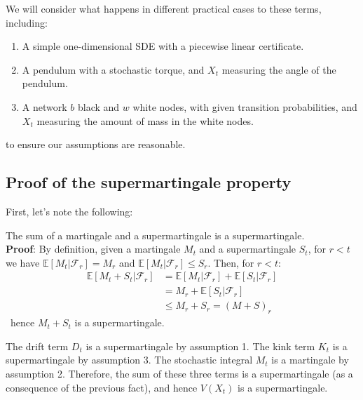 We will consider what happens in different practical cases to these terms, including: 
\begin{enumerate}
  \item A simple one-dimensional SDE with a piecewise linear certificate.
  \item A pendulum with a stochastic torque, and $X_t$ measuring the angle of the pendulum.
  \item A network $b$ black and $w$ white nodes, with given transition probabilities, and $X_t$ measuring the amount of mass in the white nodes. 
\end{enumerate}
to ensure our assumptions are reasonable.

\subsection{Proof of the supermartingale property}

First, let's note the following:

\begin{fact}
  The sum of a martingale and a supermartingale is a supermartingale. \\
  \linebreak
  \textbf{Proof}: By definition, given a martingale $M_t$ and a supermartingale $S_t$, for $r < t$ we have 
  $\mathbb{E}[M_t | \mathcal{F}_r] = M_r$ and 
  $\mathbb{E}[M_t | \mathcal{F}_r] \leq S_r$. Then, for $r < t$:
  \begin{align}
    \mathbb{E}[M_t + S_t | \mathcal{F}_r] &= \mathbb{E}[M_t | \mathcal{F}_r] + \mathbb{E}[S_t | \mathcal{F}_r] \\
    &= M_r + \mathbb{E}[S_t | \mathcal{F}_r] \\
    &\leq M_r + S_r = (M + S)_r
  \end{align}
\
hence $M_t + S_t$ is a supermartingale.

\end{fact}

The drift term $D_t$ is a supermartingale by assumption 1. The kink term $K_t$ is a supermartingale by assumption 3. The stochastic integral $M_t$ is a martingale by assumption 2. Therefore, the sum of these three terms is a supermartingale (as a consequence of the previous fact), and hence $V(X_t)$ is a supermartingale.

